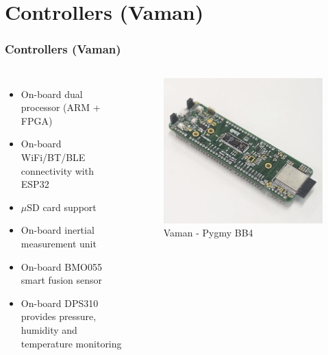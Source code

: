 \documentclass[xcolor=table]{beamer}
\begin{document}
\section{Controllers (Vaman)}
\begin{frame}
\frametitle{Controllers (Vaman)}
\begin{columns}
	\begin{itemize}
		\item On-board dual processor (ARM + FPGA)
		\item On-board WiFi/BT/BLE connectivity with ESP32
		\item $\mu$SD card support
		\item On-board inertial measurement unit
		\item On-board BMO055 smart fusion sensor
		\item On-board DPS310 provides pressure, humidity and temperature monitoring
	\end{itemize}

	\begin{figure}[h!]
  		\centering
  		\includegraphics[width=0.8\linewidth]{./figs/Vaman.png}
  		\caption{Vaman - Pygmy BB4}
  		\label{Vaman}
	\end{figure}
\end{columns}
\end{frame}
\end{document}
